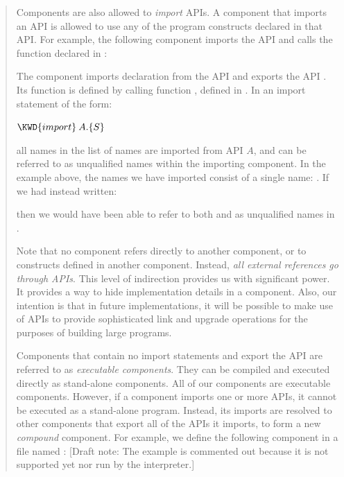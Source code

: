 \begin{description}
\begin{quote}
Components are also allowed to \emph{import} APIs. A component that
imports an API is allowed to use any of the program constructs
declared in that API. For example, the following component imports the API
 and calls the function  declared in :


The component  imports declaration  from the API 
and exports the API
. Its  function is defined by calling function
, defined in .
In an import statement of the form:
\begin{Fortress}
\(\KWD{import}\:A.\{S\}\)
\end{Fortress}
all names in the list of names  are imported from API $A$, and can be
referred to as unqualified names within the importing component. In
the example above, the names we have imported consist of a
single name: . If we had instead written:

then we would have been able to refer to both  and 
as unqualified names in .

Note that no component refers directly to another component,
or to constructs defined in another component.
Instead, \emph{all external references go through APIs}.
This level of indirection provides us with significant power.
It provides a way to hide implementation details in a component.
Also, our intention is that in future implementations,
it will be possible to make use of APIs to provide sophisticated
link and upgrade operations for the purposes of building
large programs.

Components that contain no import statements and export the API
 are referred to as \emph{executable components}. They
can be compiled and executed directly as stand-alone components. All
of our  components are executable components.
However,
if a component imports one or more APIs, it cannot be executed as a
stand-alone program. Instead, its imports are resolved to
other components that export all of the APIs it imports,
to form a new \emph{compound} component. For example, we define
the following component in a file named :
[Draft note: The example is commented out because it is not supported yet nor run by the interpreter.]
%


\end{quote}
\end{description}
